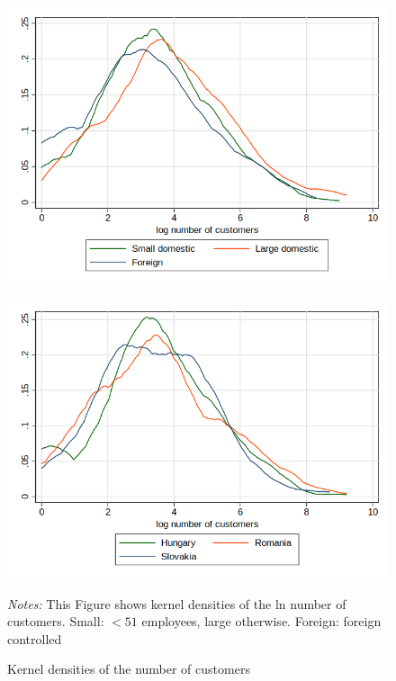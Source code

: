 \documentclass[final, dvipsnames, authoryear,12pt]{elsarticle}
\begin{document}
\begin{figure}[h]    
    \begin{center}
    \caption{Kernel densities of the number of customers}
    \label{fig:kernel}       
    \begin{subfloat}
    {\includegraphics[scale=0.5]{graphs/Fig5a.png}}
    \end{subfloat}
    \begin{subfloat}[By country]
    {\includegraphics[scale=0.5]{graphs/Fig5b.png}}
    \end{subfloat}
    \end{center}
    {\footnotesize \textit{Notes:} This Figure shows kernel densities of the ln number of customers. Small: $< 51$ employees, large otherwise. Foreign: foreign controlled}     
\end{figure}
\end{document}
